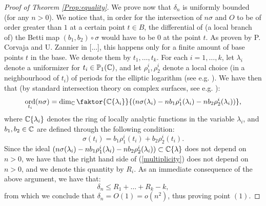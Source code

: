 \documentclass[a4paper,12pt]{article}
\DeclareMathOperator{\ord}{ord}
\begin{document}
\begin{proof}[Proof of Theorem \ref{Prop:equality}]
	We prove now that $\delta_n$ is uniformly bounded (for any $n>0$). We notice that, in order for the intersection of $n \sigma$ and $O$ to be of order greater than $1$ at a certain point $t \in B$, the differential of (a local branch of) the Betti map $(b_1,b_2)\circ \sigma$ would have to be $0$ at the point $t$. As proven by P. Corvaja and U. Zannier in [...], this happens only for a finite amount of base points $t$ in the base. We denote them by $t_1,\dots, t_k$. For each $i=1,\dots, k$, let $\lambda_i$ denote a uniformizer for $t_i \in \mathbb{P}_1(\mathbb C)$, and let $\rho^i_1, \rho^i_2$ denote a local choice (in a neighbourhood of $t_i$) of periods for the elliptic logarithm (see e.g. \cite[Section 1.1]{bettitorsion}). We have then that (by standard intersection theory on complex surfaces, see e.g. \cite[Chapter I]{beauville}):
	\begin{equation}\label{multiplicity}
	\ord_{t_i}(n\sigma)=\dim_{\C} \faktor{\C\{\lambda_i\}}{(n\sigma(\lambda_i)-nb_1\rho^i_1(\lambda_i)-nb_2\rho^i_2(\lambda_i))}, 
	\end{equation}
	where $\mathbb C\{\lambda_i\}$ denotes the ring of locally analytic functions in the variable $\lambda_i$, and $b_1, b_2 \in \mathbb C$ are defined through the following condition: \[\sigma(t_i)=b_1\rho^i_1(t_i)+b_2\rho^i_2(t_i).\]	
	Since the ideal $(n\sigma(\lambda_i)-nb_1\rho^i_1(\lambda_i)-nb_2\rho^i_2(\lambda_i)) \subset \mathbb C\{\lambda\}$ does not depend on $n>0$, we have that the right hand side of (\ref{multiplicity}) does not depend on $n>0$, and we denote this quantity by $R_i$. As an immediate consequence of the above argument, we have that:
	\[
	\delta_n \leq R_1 + \dots + R_k - k,
	\] 
	from which we conclude that $\delta_n =O(1)=o(n^2)$, thus proving point $(1)$.
	

\end{proof}
\end{document}
